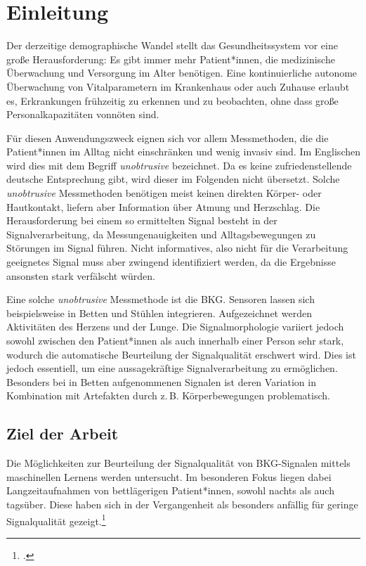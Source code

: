 \chapter{Einleitung}\label{einleitung}

Der derzeitige demographische Wandel stellt das Gesundheitssystem vor eine große Herausforderung: Es gibt immer mehr Patient*innen, die medizinische Überwachung und Versorgung im Alter benötigen. Eine kontinuierliche autonome Überwachung von Vitalparametern im Krankenhaus oder auch Zuhause erlaubt es, Erkrankungen frühzeitig zu erkennen und zu beobachten, ohne dass große Personalkapazitäten vonnöten sind.

Für diesen Anwendungszweck eignen sich vor allem Messmethoden, die die Patient*innen im Alltag nicht einschränken und wenig invasiv sind. Im Englischen wird dies mit dem Begriff \textit{unobtrusive} bezeichnet. Da es keine zufriedenstellende deutsche Entsprechung gibt, wird dieser im Folgenden nicht übersetzt. Solche \textit{unobtrusive} Messmethoden benötigen meist keinen direkten Körper- oder Hautkontakt, liefern aber Information über Atmung und Herzschlag. Die Herausforderung bei einem so ermittelten Signal besteht in der Signalverarbeitung, da Messungenauigkeiten und Alltagsbewegungen zu Störungen im Signal führen. Nicht informatives, also nicht für die Verarbeitung geeignetes Signal muss aber zwingend identifiziert werden, da die Ergebnisse ansonsten stark verfälscht würden.

Eine solche \textit{unobtrusive} Messmethode ist die \acf{BKG}. Sensoren lassen sich beispielsweise in Betten und Stühlen integrieren. Aufgezeichnet werden Aktivitäten des Herzens und der Lunge. Die Signalmorphologie variiert jedoch sowohl zwischen den Patient*innen als auch innerhalb einer Person sehr stark, wodurch die automatische Beurteilung der Signalqualität erschwert wird. Dies ist jedoch essentiell, um eine aussagekräftige Signalverarbeitung zu ermöglichen. Besonders bei in Betten aufgenommenen Signalen ist deren Variation in Kombination mit Artefakten durch z.\,B. Körperbewegungen problematisch.  
 

\section{Ziel der Arbeit}

Die Möglichkeiten zur Beurteilung der Signalqualität von \ac{BKG}-Signalen mittels maschinellen Lernens werden untersucht. Im besonderen Fokus liegen dabei Langzeitaufnahmen von bettlägerigen Patient*innen, sowohl nachts als auch tagsüber. Diese  haben sich in der Vergangenheit als besonders anfällig für geringe Signalqualität gezeigt.\footcite[Vgl.][]{HoogAntink2020}

